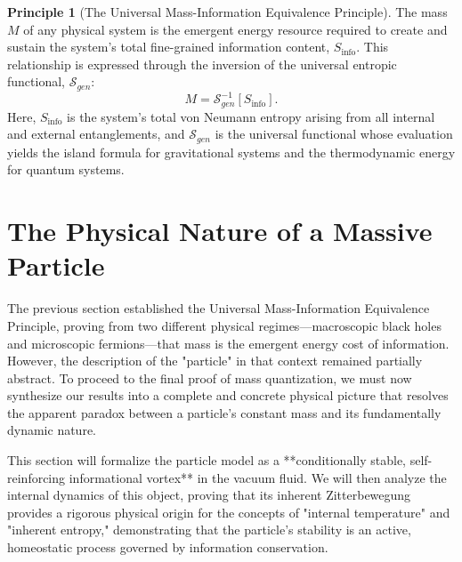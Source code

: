 \documentclass[11pt, letterpaper]{report}
\theoremstyle{plain} %
\theoremstyle{definition} %
\newtheorem{principle}{Principle}[chapter]
\theoremstyle{remark} %
\begin{document}
\begin{principle}[The Universal Mass-Information Equivalence Principle]
\label{principle:mass_info_universal}
The mass $M$ of any physical system is the emergent energy resource required to create and sustain the system's total fine-grained information content, $S_{\text{info}}$. This relationship is expressed through the inversion of the universal entropic functional, $\mathcal{S}_{gen}$:
\begin{equation}
    M = \mathcal{S}_{gen}^{-1}[S_{\text{info}}].
\end{equation}
Here, $S_{\text{info}}$ is the system’s total von Neumann entropy arising from all internal and external entanglements, and $\mathcal{S}_{gen}$ is the universal functional whose evaluation yields the island formula for gravitational systems and the thermodynamic energy for quantum systems.
\end{principle}















\section{The Physical Nature of a Massive Particle}
\label{sec:physical_nature_of_particle}

The previous section established the Universal Mass-Information Equivalence Principle, proving from two different physical regimes—macroscopic black holes and microscopic fermions—that mass is the emergent energy cost of information. However, the description of the "particle" in that context remained partially abstract. To proceed to the final proof of mass quantization, we must now synthesize our results into a complete and concrete physical picture that resolves the apparent paradox between a particle's constant mass and its fundamentally dynamic nature.

This section will formalize the particle model as a **conditionally stable, self-reinforcing informational vortex** in the vacuum fluid. We will then analyze the internal dynamics of this object, proving that its inherent Zitterbewegung provides a rigorous physical origin for the concepts of "internal temperature" and "inherent entropy," demonstrating that the particle's stability is an active, homeostatic process governed by information conservation.
\end{document}
